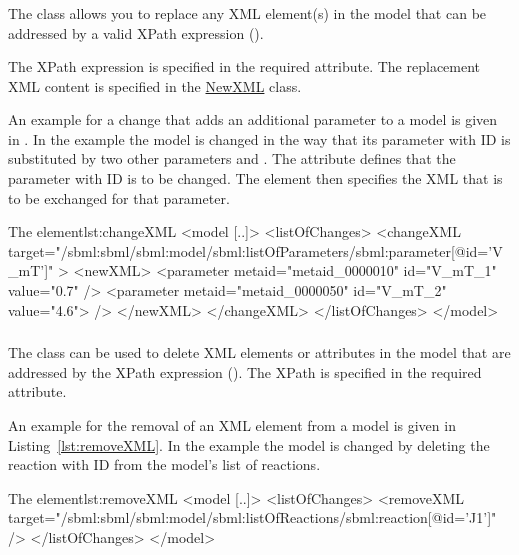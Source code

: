 \subsubsection{}
\label{class:changeXml}
The  class allows you to replace any XML element(s) in the model that can be addressed by a valid XPath expression ().

The XPath expression is specified in the required \hyperref[sec:changeTarget]{} attribute. The replacement XML content is specified in the \hyperref[sec:newXml]{NewXML} class.

An example for a change that adds an additional parameter to a model is given in . In the example the model is changed in the way that its parameter with ID  is substituted by two other parameters  and . The  attribute defines that the parameter with ID  is to be changed. The  element then specifies the XML that is to be exchanged for that parameter.

\begin{myXmlLst}{The  element}{lst:changeXML}
<model [..]>
	<listOfChanges>
		<changeXML target="/sbml:sbml/sbml:model/sbml:listOfParameters/sbml:parameter[@id='V_mT']" >
			<newXML>
				<parameter metaid="metaid_0000010" id="V_mT_1" value="0.7" />
				<parameter metaid="metaid_0000050" id="V_mT_2" value="4.6"> />
			</newXML>
		</changeXML>
	</listOfChanges>
</model>
\end{myXmlLst}


\subsubsection{}
\label{class:removeXml}
The  class can be used to delete XML elements or attributes in the model that are addressed by the XPath expression (). The XPath is specified in the required \hyperref[sec:changeTarget]{} attribute.

An example for the removal of an XML element from a model is given in Listing~\ref{lst:removeXML}. In the example the model is changed by deleting the reaction with ID  from the model's list of reactions.

\begin{myXmlLst}{The  element}{lst:removeXML}
<model [..]>
	<listOfChanges>
		<removeXML target="/sbml:sbml/sbml:model/sbml:listOfReactions/sbml:reaction[@id='J1']" />
	</listOfChanges>
</model>
\end{myXmlLst}


